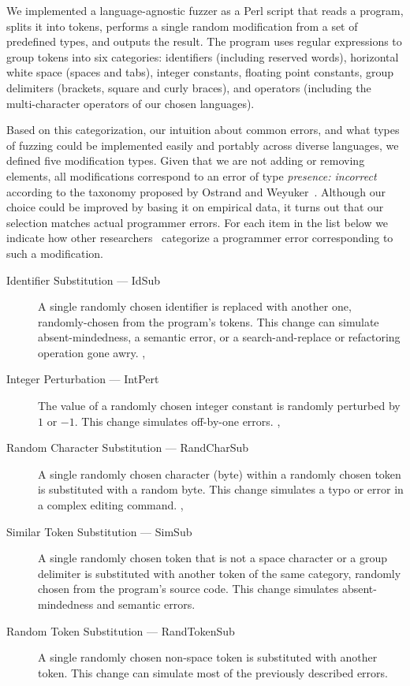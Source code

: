 \documentclass[10pt]{sigplanconf}
\begin{document}
We implemented a language-agnostic fuzzer as a Perl script
that reads a program,
splits it into tokens,
performs a single random modification from a set of
predefined types,
and outputs the result.
The program uses regular expressions to group tokens into
six categories:
identifiers (including reserved words),
horizontal white space (spaces and tabs),
integer constants,
floating point constants,
group delimiters (brackets, square and curly braces), and
operators (including the multi-character operators of our chosen languages).

Based on this categorization,
our intuition about common errors, and
what types of fuzzing could be implemented easily and portably across
diverse languages,
we defined five modification types.
Given that we are not adding or removing elements,
all modifications correspond to an error of type
{\em presence: incorrect} according to the taxonomy proposed
by Ostrand and Weyuker~\cite{OW84}.
Although our choice could be improved by basing it on empirical data,
it turns out that our selection matches actual programmer errors.
For each item in the list below we indicate how other
researchers~\cite{End75,KNUTH89} categorize a programmer error
corresponding to such a modification.

\begin{description}
\item [Identifier Substitution --- IdSub]
A single randomly chosen identifier is replaced with another one,
randomly-chosen from the program's tokens.
This change can simulate absent-mindedness, a semantic error, or
a search-and-replace or refactoring operation gone awry.
\cite[B3.b]{End75},
\cite[B]{KNUTH89}
\item [Integer Perturbation --- IntPert]
The value of a randomly chosen integer constant
is randomly perturbed by $1$ or $-1$.
This change simulates off-by-one errors.
\cite[B4.b]{End75},
\cite[A]{KNUTH89}
\item [Random Character Substitution --- RandCharSub]
A single randomly chosen character (byte) within a randomly chosen token
is substituted with a random byte.
This change simulates a typo or error in a complex editing command.
\cite[C1]{End75},
\cite[T]{KNUTH89}
\item [Similar Token Substitution --- SimSub]
A single randomly chosen token
that is not a space character or a group delimiter
is substituted with another token of the same category,
randomly chosen from the program's source code.
This change simulates absent-mindedness and semantic errors.
\cite[B]{KNUTH89}
\item [Random Token Substitution --- RandTokenSub]
A single randomly chosen non-space token
is substituted with another token.
This change can simulate most of the previously described errors.
\cite[T, B]{KNUTH89}
\end{description}
\end{document}
